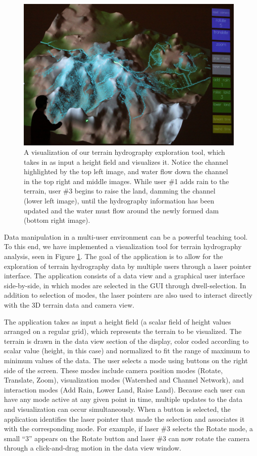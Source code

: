 \documentclass[review]{vgtc}                 %
\begin{document}
\begin{figure}[t]
\begin{center}
\begin{minipage}{0.99\linewidth}
    \includegraphics[width=0.49\linewidth]{images/terrain5.jpg}
  \end{minipage}  
  \end{center}
  \caption{\label{figure:hydrographyVisualization} A visualization of our terrain hydrography exploration tool, 
which takes in as input a height field and visualizes it. Notice the channel highlighted by the top left image, 
and water flow down the channel in the top right and middle images. While user \#1 adds rain to the terrain, user 
\#3 begins to raise the land, damming the channel (lower left image), until the hydrography information has been 
updated and the water must flow around the newly formed dam (bottom right image). }
\end{figure}


Data manipulation in a multi-user environment can be a powerful teaching tool. To this end, we have implemented 
a visualization tool for terrain hydrography analysis, seen in Figure \ref{figure:hydrographyVisualization}.
The goal of the application is to allow for the exploration of terrain hydrography data by multiple users through 
a laser pointer interface. The application consists of a data view and a graphical user interface side-by-side, 
in which modes are selected in the GUI through dwell-selection. In addition to selection of modes, the laser 
pointers are also used to interact directly with the 3D terrain data and camera view.

The application takes as input a height field (a scalar field of height values arranged on a regular grid), 
which represents the terrain to be visualized. The terrain is drawn in the data view section of the display, 
color coded according to scalar value (height, in this case) and normalized to fit the range of maximum to minimum 
values of the data. The user selects a mode using buttons on the right side of the screen. These modes include 
camera position modes (Rotate, Translate, Zoom), visualization modes (Watershed and Channel Network), and 
interaction modes (Add Rain, Lower Land, Raise Land). Because each user can have any mode active at any given point in 
time, multiple updates to the data and visualization can occur simultaneously. When a button is selected, the application 
identifies the laser pointer that made the selection and associates it with the corresponding mode. For example, if laser 
\#3 selects the Rotate mode, a small ``3'' appears on the Rotate button and laser \#3 can now rotate the camera through a 
click-and-drag motion in the data view window.
\end{document}
